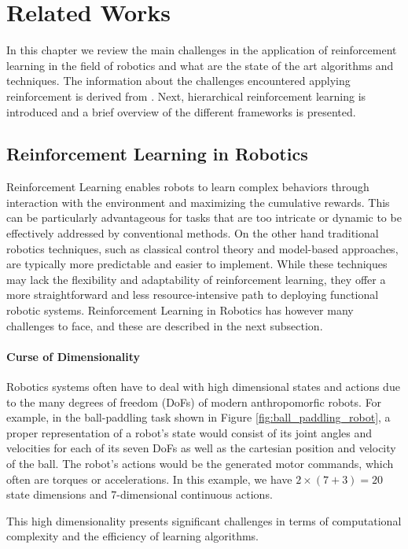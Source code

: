 \chapter{Related Works}
In this chapter we review the main challenges in the application of reinforcement learning in the
field of robotics and what are the state of the art algorithms and techniques. 
The information about the challenges encountered applying reinforcement is derived from \cite{Kober2013}.
Next, hierarchical reinforcement learning is introduced and a brief overview of the different frameworks is presented.

\section{Reinforcement Learning in Robotics}
Reinforcement Learning enables robots to learn complex behaviors through interaction with the environment and maximizing the cumulative rewards.
This can be particularly advantageous for tasks that are too intricate or dynamic to be effectively addressed by conventional methods.
On the other hand traditional robotics techniques, such as classical control theory and model-based approaches, are typically more predictable and easier to implement.
While these techniques may lack the flexibility and adaptability of reinforcement learning, they offer a more straightforward and less resource-intensive path to deploying
functional robotic systems. Reinforcement Learning in Robotics has however many challenges to face, and these are described in the next subsection.

\subsubsection{Curse of Dimensionality}
Robotics systems often have to deal with high dimensional states and actions due to the many degrees of freedom (DoFs) of modern
anthropomorfic robots. For example, in the ball-paddling task shown in Figure \ref{fig:ball_paddling_robot}, a proper representation
of a robot's state would consist of its joint angles and velocities for each of its seven DoFs as well as the cartesian position
and velocity of the ball. The robot's actions would be the generated motor commands, which often are torques or accelerations.
In this example, we have $2\times\left(7 + 3\right)=20$ state dimensions and 7-dimensional continuous actions.

This high dimensionality presents significant challenges in terms of computational complexity 
and the efficiency of learning algorithms.

